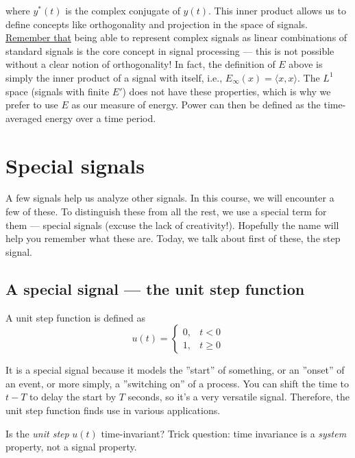 where $y^*(t)$ is the complex conjugate of $y(t)$. This inner product allows us to define concepts like orthogonality and projection in the space of signals. \ul{Remember that} being able to represent complex signals as linear combinations of standard signals is the core concept in signal processing --- this is not possible without a clear notion of orthogonality! In fact, the definition of $E$ above is simply the inner product of a signal with itself, i.e., $E_\infty(x) = \langle x, x \rangle$. The $L^1$ space (signals with finite $E'$) does not have these properties, which is why we prefer to use $E$ as our measure of energy. Power can then be defined as the time-averaged energy over a time period.

\section{Special signals}
A few signals help us analyze other signals. In this course, we will encounter a few of these. To distinguish these from all the rest, we use a special term for them --- special signals (excuse the lack of creativity!). Hopefully the name will help you remember what these are. Today, we talk about first of these, the step signal.
\subsection{A special signal --- the unit step function}
A unit step function is defined as
\[
u(t) = \begin{cases}
0, & t < 0 \\
1, & t \geq 0
\end{cases}
\]

It is a special signal because it models the ''start'' of something, or an ''onset'' of an event, or more simply, a ''switching on'' of a process. You can shift the time to $t - T$ to delay the start by $T$ seconds, so it's a very versatile signal. Therefore, the unit step function finds use in various applications. 

\begin{popquiz} 
    Is the \emph{unit step} $u(t)$ time-invariant?
    \popqsplit
     Trick question: time invariance is a \emph{system} property, not a signal property.
\end{popquiz}



